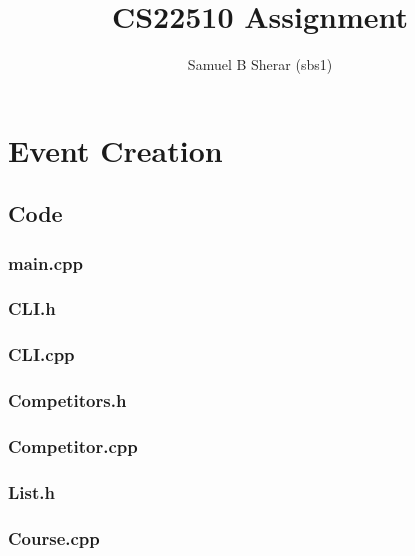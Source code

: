 \documentclass[10pt, a4paper]{article}
\begin{document}
\title{CS22510 Assignment}
\author{Samuel B Sherar (sbs1)}

\maketitle

\newpage

\tableofcontents

\newpage

\section{Event Creation}

\subsection{Code}
\lstset{tabsize=2, breaklines=true, breakatwhitespace=true, basicstyle=\ttfamily}
\subsubsection{main.cpp}


\subsubsection{CLI.h}


\subsubsection{CLI.cpp}


\subsubsection{Competitors.h}


\subsubsection{Competitor.cpp}


\subsubsection{List.h}


\subsubsection{Course.cpp}

\end{document}
